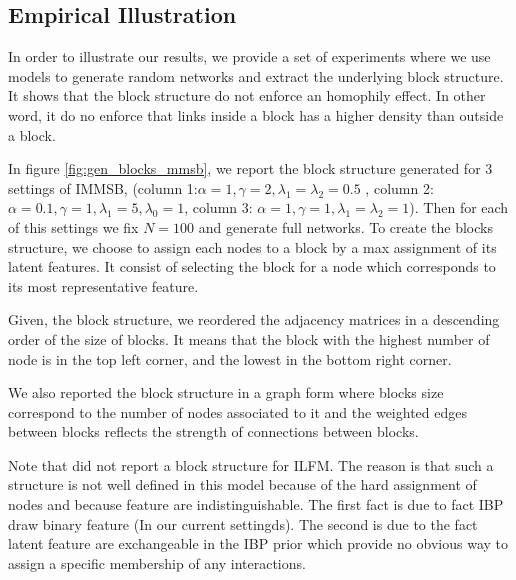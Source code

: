 \subsection{Empirical Illustration}
\label{subsec:mg}

In order to illustrate our results, we provide a set of experiments where we use models to generate random networks and extract the underlying block structure. It shows that the block structure do not enforce an homophily effect. In other word, it do no enforce that links inside a block has a higher density than outside a block.

In figure \ref{fig:gen_blocks_mmsb}, we report the block structure  generated for 3 settings of IMMSB, (column 1:$\alpha=1, \gamma=2, \lambda_1=\lambda_2=0.5$ , column 2:$\alpha=0.1, \gamma=1, \lambda_1=5, \lambda_0=1$, column 3: $\alpha=1, \gamma=1, \lambda_1=\lambda_2=1$). Then for each of this settings we fix $N=100$ and generate full networks. To create the blocks structure, we choose to assign each nodes to a block by a max assignment of its latent features. It consist of selecting the block for a node which corresponds to its most representative feature.


Given, the block structure, we reordered the adjacency matrices in a descending order of the size of blocks. It means that the block with the highest number of node is in the top left corner, and the lowest in the bottom right corner.

We also reported the block structure in a graph form where blocks size correspond to the number of nodes associated to it and the weighted edges between blocks reflects the strength of connections between blocks.

Note that did not report a block structure for ILFM. The reason is that such a structure is not well defined in this model because of the hard assignment of nodes and because feature are indistinguishable. The first fact is due to fact IBP draw binary feature (In our current settingds). The second is due to the fact latent feature are exchangeable in the IBP prior which provide no obvious way to assign a specific membership of any interactions. 

